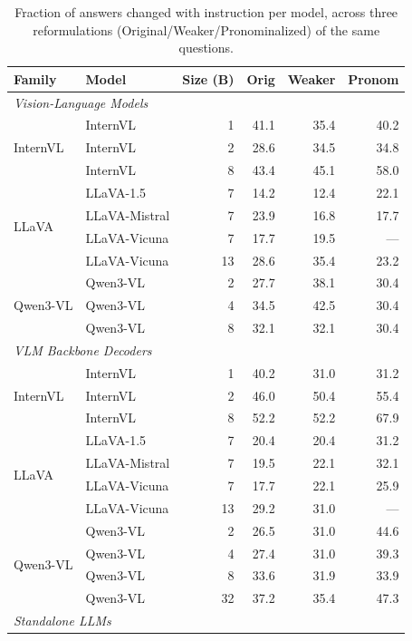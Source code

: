\begin{table}[h]
\centering
\small

\caption{Fraction of answers changed with instruction per model, across three reformulations (Original/Weaker/Pronominalized) of the same questions.}
\label{tab:response_change_variants}
\begin{tabular}{llrrrr}
\toprule
Family & Model & Size (B) & Orig & Weaker & Pronom \\
\midrule
\multicolumn{6}{l}{\textit{Vision-Language Models}} \\
\midrule
\multirow{3}{*}{InternVL} & InternVL & 1 & 41.1 & 35.4 & 40.2 \\
 & InternVL & 2 & 28.6 & 34.5 & 34.8 \\
 & InternVL & 8 & 43.4 & 45.1 & 58.0 \\
\midrule
\multirow{4}{*}{LLaVA} & LLaVA-1.5 & 7 & 14.2 & 12.4 & 22.1 \\
 & LLaVA-Mistral & 7 & 23.9 & 16.8 & 17.7 \\
 & LLaVA-Vicuna & 7 & 17.7 & 19.5 & --- \\
 & LLaVA-Vicuna & 13 & 28.6 & 35.4 & 23.2 \\
\midrule
\multirow{3}{*}{Qwen3-VL} & Qwen3-VL & 2 & 27.7 & 38.1 & 30.4 \\
 & Qwen3-VL & 4 & 34.5 & 42.5 & 30.4 \\
 & Qwen3-VL & 8 & 32.1 & 32.1 & 30.4 \\
\midrule
\multicolumn{6}{l}{\textit{VLM Backbone Decoders}} \\
\midrule
\multirow{3}{*}{InternVL} & InternVL & 1 & 40.2 & 31.0 & 31.2 \\
 & InternVL & 2 & 46.0 & 50.4 & 55.4 \\
 & InternVL & 8 & 52.2 & 52.2 & 67.9 \\
\midrule
\multirow{4}{*}{LLaVA} & LLaVA-1.5 & 7 & 20.4 & 20.4 & 31.2 \\
 & LLaVA-Mistral & 7 & 19.5 & 22.1 & 32.1 \\
 & LLaVA-Vicuna & 7 & 17.7 & 22.1 & 25.9 \\
 & LLaVA-Vicuna & 13 & 29.2 & 31.0 & --- \\
\midrule
\multirow{4}{*}{Qwen3-VL} & Qwen3-VL & 2 & 26.5 & 31.0 & 44.6 \\
 & Qwen3-VL & 4 & 27.4 & 31.0 & 39.3 \\
 & Qwen3-VL & 8 & 33.6 & 31.9 & 33.9 \\
 & Qwen3-VL & 32 & 37.2 & 35.4 & 47.3 \\
\midrule
\multicolumn{6}{l}{\textit{Standalone LLMs}} \\

\end{tabular}
\end{table}
